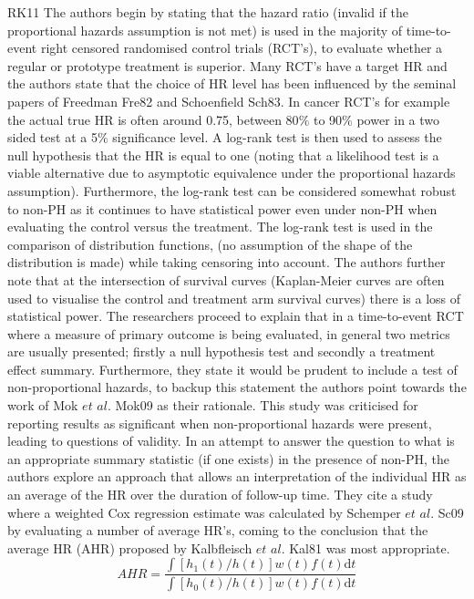 \documentclass[12pt,twoside]{reedthesis}
\begin{document}
RK11
The authors begin by stating that the hazard ratio (invalid if the proportional hazards assumption is not met) is used in the majority of time-to-event right censored randomised control trials (RCT's), to evaluate whether a regular or prototype treatment is superior.
Many RCT's have a target HR and the authors state that the choice of HR level has been influenced by the seminal papers of Freedman Fre82 and Schoenfield Sch83. In cancer RCT's for example the actual true HR is often around 0.75, between 80\(\%\) to 90\(\%\) power in a two sided test at a 5\(\%\) significance level. A log-rank test is then used to assess the null hypothesis that the HR is equal to one (noting that a likelihood test is a viable alternative due to asymptotic equivalence under the proportional hazards assumption). Furthermore, the log-rank test can be considered somewhat robust to non-PH as it continues to have statistical power even under non-PH when evaluating the control versus the treatment. The log-rank test is used in the comparison of distribution functions, (no assumption of the shape of the distribution is made) while taking censoring into account. The authors further note that at the intersection of survival curves (Kaplan-Meier curves are often used to visualise the control and treatment arm survival curves) there is a loss of statistical power.
The researchers proceed to explain that in a time-to-event RCT where a measure of primary outcome is being evaluated, in general two metrics are usually presented; firstly a null hypothesis test and secondly a treatment effect summary. Furthermore, they state it would be prudent to include a test of non-proportional hazards, to backup this statement the authors point towards the work of Mok \(\textit{et al.}\) Mok09 as their rationale. This study was criticised for reporting results as significant when non-proportional hazards were present, leading to questions of validity.
In an attempt to answer the question to what is an appropriate summary statistic (if one exists) in the presence of non-PH, the authors explore an approach that allows an interpretation of the individual HR as an average of the HR over the duration of follow-up time. They cite a study where a weighted Cox regression estimate was calculated by Schemper \(\textit{et al.}\) Sc09 by evaluating a number of average HR's, coming to the conclusion that the average HR (AHR) proposed by Kalbfleisch \(\textit{et al.}\) Kal81 was most appropriate.
\[\textit{AHR}=\frac{\int\left[h_{1}(t) / h(t)\right] w(t) f(t) \mathrm{d} t}{\int\left[h_{0}(t) / h(t)\right] w(t) f(t) \mathrm{d} t}\]
\end{document}
